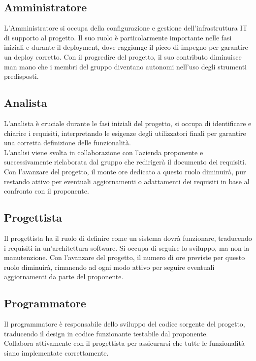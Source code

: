 \documentclass{article}
\begin{document}
		\subsection{Amministratore}
		L'Amministratore si occupa della configurazione e gestione dell'infrastruttura IT di supporto al progetto.
		Il suo ruolo è particolarmente importante nelle fasi iniziali e durante il deployment, dove raggiunge il picco di impegno per garantire un deploy corretto.
		Con il progredire del progetto, il suo contributo diminuisce man mano che i membri del gruppo diventano autonomi nell'uso degli strumenti predisposti.
		
		\subsection{Analista}
		L'analista è cruciale durante le fasi iniziali del progetto, si occupa di identificare e chiarire i requisiti, interpretando le esigenze degli utilizzatori finali per garantire una corretta definizione delle funzionalità.\\
		L'analisi viene svolta in collaborazione con l'azienda proponente e successivamente rielaborata dal gruppo che redirigerà il documento dei requisiti.\\
		Con l’avanzare del progetto, il monte ore dedicato a questo ruolo diminuirà, pur restando attivo per eventuali aggiornamenti o adattamenti dei requisiti in base al confronto con il proponente.
		
		\subsection{Progettista}
		Il progettista ha il ruolo di definire come un sistema dovrà funzionare, traducendo i requisiti in un'architettura software.
		Si occupa di seguire lo sviluppo, ma non la manutenzione.
		Con l'avanzare del progetto, il numero di ore previste per questo ruolo diminuirà, rimanendo ad ogni modo attivo per seguire eventuali aggiornamenti da parte del proponente.

		\subsection{Programmatore}
		Il programmatore è responsabile dello sviluppo del codice sorgente del progetto, traducendo il design in codice funzionante testabile dal proponente.\\
		Collabora attivamente con il progettista per assicurarsi che tutte le funzionalità siano implementate correttamente.
\end{document}
